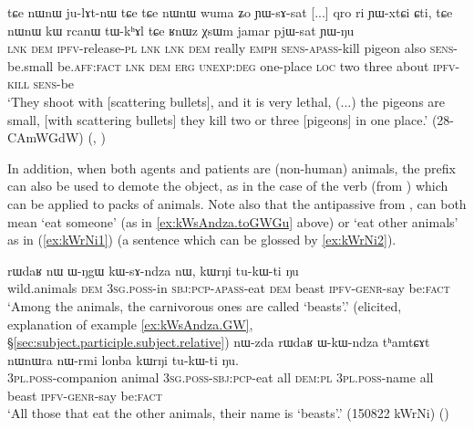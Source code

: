 \begin{exe}
\ex \label{ex:YWsAsat}
\gll tɕe nɯnɯ ju-lɤt-nɯ tɕe tɕe nɯnɯ wuma ʑo ɲɯ-sɤ-sat [...] qro ri ɲɯ-xtɕi ɕti, tɕe nɯnɯ kɯ rcanɯ tɯ-kʰɤl tɕe ʁnɯz χsɯm jamar pjɯ-sat ɲɯ-ŋu \\
\textsc{lnk} \textsc{dem} \textsc{ipfv}-release-\textsc{pl} \textsc{lnk} \textsc{lnk} \textsc{dem} really \textsc{emph} \textsc{sens}-\textsc{apass}-kill {  } pigeon also \textsc{sens}-be.small be.\textsc{aff}:\textsc{fact} \textsc{lnk} \textsc{dem} \textsc{erg} \textsc{unexp}:\textsc{deg} one-place \textsc{loc} two three about \textsc{ipfv}-\textsc{kill} \textsc{sens}-be  \\
\glt `They shoot with [scattering bullets], and it is very lethal, (...) the pigeons are small, [with scattering bullets] they kill two or three [pigeons] in one place.' (28-CAmWGdW) 	(, )
\end{exe}

In addition, when both agents and patients are (non-human) animals, the prefix  can also be used to demote the object, as in the case of the verb  (from ) which can be applied to packs of animals. Note also that the antipassive  from , can both mean `eat someone' (as in \ref{ex:kWsAndza.toGWGu} above) or `eat other animals' as in (\ref{ex:kWrNi1}) (a sentence which can be glossed by \ref{ex:kWrNi2}).

\begin{exe}
\ex 
\begin{xlist}
\ex \label{ex:kWrNi1}
\gll rɯdaʁ nɯ ɯ-ŋgɯ kɯ-sɤ-ndza nɯ, kɯrŋi tu-kɯ-ti ŋu \\
wild.animals \textsc{dem} \textsc{3sg}.\textsc{poss}-in \textsc{sbj}:\textsc{pcp}-\textsc{apass}-eat \textsc{dem} beast \textsc{ipfv}-\textsc{genr}-say be:\textsc{fact} \\
\glt `Among the animals, the carnivorous ones are called `beasts'.' (elicited, explanation of example \ref{ex:kWsAndza.GW}, §\ref{sec:subject.participle.subject.relative})
\ex \label{ex:kWrNi2}
\gll nɯ-zda rɯdaʁ ɯ-kɯ-ndza tʰamtɕɤt nɯnɯra nɯ-rmi lonba kɯrŋi tu-kɯ-ti ŋu. \\
\textsc{3pl}.\textsc{poss}-companion animal \textsc{3sg}.\textsc{poss}-\textsc{sbj}:\textsc{pcp}-eat all \textsc{dem}:\textsc{pl} \textsc{3pl}.\textsc{poss}-name all beast \textsc{ipfv}-\textsc{genr}-say be:\textsc{fact} \\ 
\glt `All those that eat the other animals, their name is `beasts'.' (150822 kWrNi) 
()
\end{xlist}
\end{exe}


